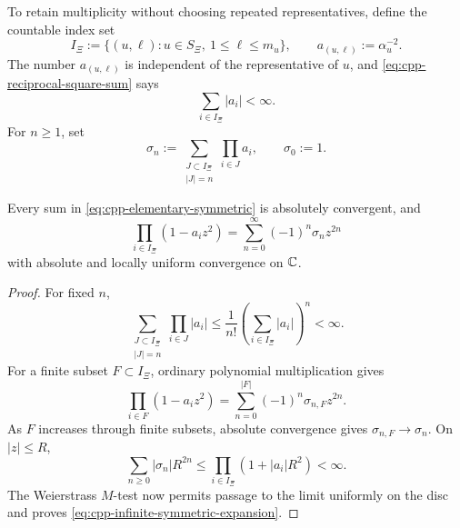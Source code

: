 To retain multiplicity without choosing repeated representatives, define the
countable index set
\begin{equation}
\label{eq:cpp-symmetric-index-set}
 I_\Xi
 :=
 \{(u,\ell):u\in S_\Xi,\ 1\leq\ell\leq m_u\},
 \qquad
 a_{(u,\ell)}:=\alpha_u^{-2}.
\end{equation}
The number \(a_{(u,\ell)}\) is independent of the representative of \(u\), and
\cref{eq:cpp-reciprocal-square-sum} says
\[
 \sum_{i\in I_\Xi}|a_i|<\infty.
\]
For \(n\geq1\), set
\begin{equation}
\label{eq:cpp-elementary-symmetric}
 \sigma_n
 :=
 \sum_{\substack{J\subset I_\Xi\\|J|=n}}
 \prod_{i\in J}a_i,
 \qquad
 \sigma_0:=1.
\end{equation}

\begin{lemma}
\label{lem:cpp-symmetric-expansion}
Every sum in \eqref{eq:cpp-elementary-symmetric} is absolutely convergent, and
\begin{equation}
\label{eq:cpp-infinite-symmetric-expansion}
 \prod_{i\in I_\Xi}(1-a_i z^2)
 =
 \sum_{n=0}^{\infty}(-1)^n\sigma_n z^{2n}
\end{equation}
with absolute and locally uniform convergence on \(\mathbb C\).
\end{lemma}

\begin{proof}
For fixed \(n\),
\[
 \sum_{\substack{J\subset I_\Xi\\|J|=n}}
 \prod_{i\in J}|a_i|
 \leq
 \frac1{n!}\left(\sum_{i\in I_\Xi}|a_i|\right)^n<\infty.
\]
For a finite subset \(F\subset I_\Xi\), ordinary polynomial multiplication
gives
\[
 \prod_{i\in F}(1-a_i z^2)
 =
 \sum_{n=0}^{|F|}(-1)^n\sigma_{n,F}z^{2n}.
\]
As \(F\) increases through finite subsets, absolute convergence gives
\(\sigma_{n,F}\to\sigma_n\).  On \(|z|\leq R\),
\[
 \sum_{n\geq0}|\sigma_n|R^{2n}
 \leq
 \prod_{i\in I_\Xi}(1+|a_i|R^2)<\infty.
\]
The Weierstrass \(M\)-test now permits passage to the limit uniformly on the
disc and proves \eqref{eq:cpp-infinite-symmetric-expansion}.
\end{proof}

